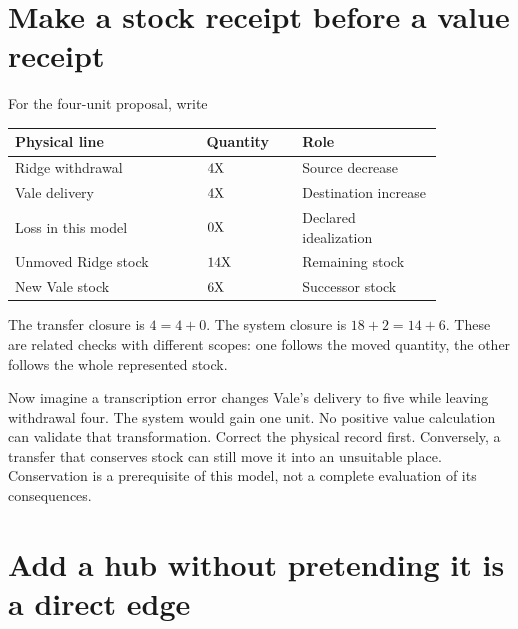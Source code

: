 \section{Make a stock receipt before a value receipt}

For the four-unit proposal, write
\begin{center}
\begin{tabular}{P{0.38\linewidth}P{0.19\linewidth}P{0.28\linewidth}}
\toprule
Physical line & Quantity & Role\\
\midrule
Ridge withdrawal & \(4\mathrm{X}\) & Source decrease\\
Vale delivery & \(4\mathrm{X}\) & Destination increase\\
Loss in this model & \(0\mathrm{X}\) & Declared idealization\\
Unmoved Ridge stock & \(14\mathrm{X}\) & Remaining stock\\
New Vale stock & \(6\mathrm{X}\) & Successor stock\\
\bottomrule
\end{tabular}
\end{center}
The transfer closure is \(4=4+0\). The system closure is \(18+2=14+6\). These are related checks with different scopes: one follows the moved quantity, the other follows the whole represented stock.

Now imagine a transcription error changes Vale's delivery to five while leaving withdrawal four. The system would gain one unit. No positive value calculation can validate that transformation. Correct the physical record first. Conversely, a transfer that conserves stock can still move it into an unsuitable place. Conservation is a prerequisite of this model, not a complete evaluation of its consequences.

\section{Add a hub without pretending it is a direct edge}

